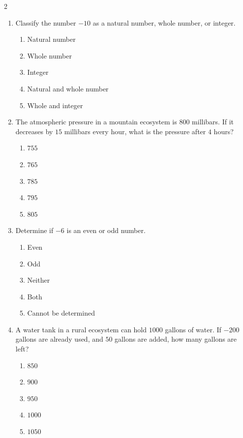 \documentclass[10pt]{article}
\begin{document}
\begin{multicols}{2}
\begin{enumerate}[label=\textbf{Q\arabic*.}, leftmargin=*, itemsep=6pt, parsep=0pt]
  \item \small Classify the number $-10$ as a natural number, whole number, or integer.
  \begin{enumerate}[label=(\Alph*), leftmargin=0.6cm, nosep, itemsep=2pt]
    \item Natural number
    \item Whole number
    \item Integer
    \item Natural and whole number
    \item Whole and integer
  \end{enumerate}

  \item \small The atmospheric pressure in a mountain ecosystem is $800$ millibars. If it decreases by $15$ millibars every hour, what is the pressure after $4$ hours?
  \begin{enumerate}[label=(\Alph*), leftmargin=0.6cm, nosep, itemsep=2pt]
    \item $755$
    \item $765$
    \item $785$
    \item $795$
    \item $805$
  \end{enumerate}

  \item \small Determine if $-6$ is an even or odd number.
  \begin{enumerate}[label=(\Alph*), leftmargin=0.6cm, nosep, itemsep=2pt]
    \item Even
    \item Odd
    \item Neither
    \item Both
    \item  Cannot be determined
  \end{enumerate}

  \item \small A water tank in a rural ecosystem can hold $1000$ gallons of water. If $-200$ gallons are already used, and $50$ gallons are added, how many gallons are left?
  \begin{enumerate}[label=(\Alph*), leftmargin=0.6cm, nosep, itemsep=2pt]
    \item $850$
    \item $900$
    \item $950$
    \item $1000$
    \item $1050$
  \end{enumerate}


\end{enumerate}
\end{multicols}
\end{document}
